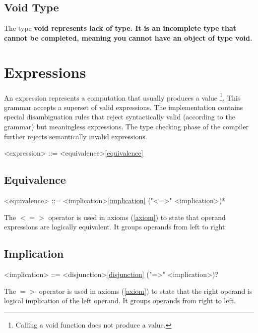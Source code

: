 \documentclass[a4paper,oneside,11pt]{article}
\begin{document}
\subsection{Void Type}

The type \bf{void} represents lack of type. It is an incomplete type that cannot be completed, meaning you cannot have an object of type \bf{void}.

\section{Expressions}

An expression represents a computation that usually produces a value \footnote{Calling a void function does not produce a value.}.
This grammar accepts a superset of valid expressions. The implementation contains special disambiguation rules that reject syntactically
valid (according to the grammar) but meaningless expressions.
The type checking phase of the compiler further rejects semantically invalid expressions.

\begin{grammar}
\label{expression}<expression> ::= <equivalence>\ref{equivalence}
\end{grammar}

\subsection{Equivalence}

\begin{grammar}
\label{equivalence}<equivalence> ::= <implication>\ref{implication} ("<=>" <implication>)*
\end{grammar}

The $<=>$ operator is used in axioms (\ref{axiom}) to state that operand expressions are logically equivalent.
It groups operands from left to right.

\subsection{Implication}

\begin{grammar}
\label{implication}<implication> ::= <disjunction>\ref{disjunction} ("=>" <implication>)?
\end{grammar}

The $=>$ operator is used in axioms (\ref{axiom}) to state that the right operand is logical implication of the left
operand. It groups operands from right to left.
\end{document}
